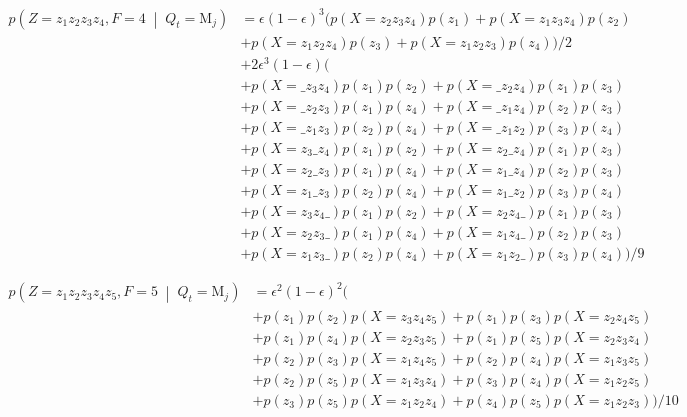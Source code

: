\documentclass[a4paper]{article}
\theoremstyle{definition}
\theoremstyle{definition}
\newcommand{\cprob}[2]{p\left(#1\;\middle|\; #2\right)}
\newcommand{\eps}{\epsilon}
\newcommand{\s}{\texttt{\char`_}}
\begin{document}
\begin{align*}
    \cprob{Z=z_1z_2z_3z_4,F=4}{Q_t=\mathrm M_j} &= \eps(1-\eps)^3 (p(X=z_2z_3z_4)p(z_1)+p(X=z_1z_3z_4)p(z_2)\\
    &+p(X=z_1z_2z_4)p(z_3)+p(X=z_1z_2z_3)p(z_4))/2\\
    &+2\eps^3(1-\eps)(\\
    &+p(X=\s z_3z_4)p(z_1)p(z_2) + p(X=\s z_2z_4)p(z_1)p(z_3)\\
    &+ p(X=\s z_2z_3)p(z_1)p(z_4) + p(X=\s z_1z_4)p(z_2)p(z_3)\\
    &+ p(X=\s z_1z_3)p(z_2)p(z_4) + p(X=\s z_1z_2)p(z_3)p(z_4)\\
    &+ p(X=z_3\s z_4)p(z_1)p(z_2) + p(X=z_2\s z_4)p(z_1)p(z_3)\\
    &+ p(X=z_2\s z_3)p(z_1)p(z_4) + p(X=z_1\s z_4)p(z_2)p(z_3)\\
    &+ p(X=z_1\s z_3)p(z_2)p(z_4) + p(X=z_1\s z_2)p(z_3)p(z_4)\\
    &+ p(X=z_3z_4\s)p(z_1)p(z_2) + p(X=z_2z_4\s)p(z_1)p(z_3)\\
    &+ p(X=z_2z_3\s)p(z_1)p(z_4) + p(X=z_1z_4\s)p(z_2)p(z_3)\\
    &+ p(X=z_1z_3\s)p(z_2)p(z_4) + p(X=z_1z_2\s)p(z_3)p(z_4))/9
\end{align*}

\begin{align*}
    \cprob{Z=z_1z_2z_3z_4z_5,F=5}{Q_t=\mathrm M_j}
        &= \eps^2(1-\eps)^2(\\
        &+p(z_1)p(z_2)p(X=z_3z_4z_5)+p(z_1)p(z_3)p(X=z_2z_4z_5)\\
        &+p(z_1)p(z_4)p(X=z_2z_3z_5)+p(z_1)p(z_5)p(X=z_2z_3z_4)\\
        &+p(z_2)p(z_3)p(X=z_1z_4z_5)+p(z_2)p(z_4)p(X=z_1z_3z_5)\\
        &+p(z_2)p(z_5)p(X=z_1z_3z_4)+p(z_3)p(z_4)p(X=z_1z_2z_5)\\
        &+p(z_3)p(z_5)p(X=z_1z_2z_4)+p(z_4)p(z_5)p(X=z_1z_2z_3))/10
\end{align*}
\end{document}
